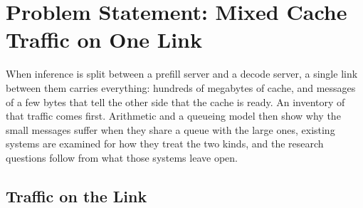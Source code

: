 \chapter{Problem Statement: Mixed Cache Traffic on One Link}
\label{ch:problem}

When inference is split between a prefill server and a decode server, a
single link between them carries everything: hundreds of megabytes of cache,
and messages of a few bytes that tell the other side that the cache is ready.
An inventory of that traffic comes first. Arithmetic and a queueing model
then show why the small messages suffer when they share a queue with the
large ones, existing systems are examined for how they treat the two kinds,
and the research questions follow from what those systems leave open.

\section{Traffic on the Link}
\label{sec:traffic}

